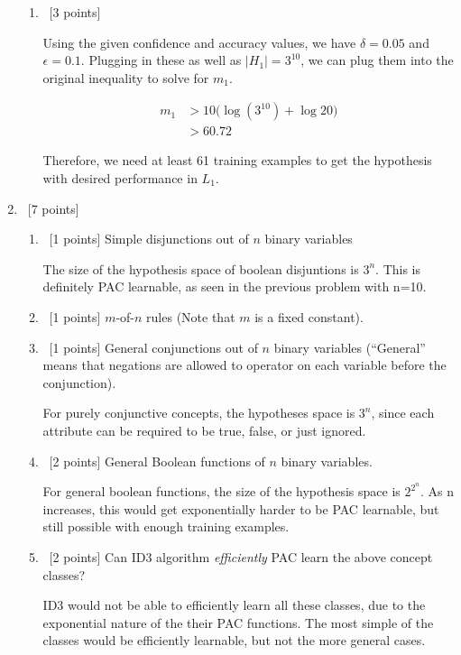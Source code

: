 \documentclass[12pt, fullpage,letterpaper]{article}
\begin{document}
\begin{enumerate}
\begin{enumerate}
	
	
	\item~[3 points] 
	
	Using the given confidence and accuracy values, we have $\delta=0.05$ and $\epsilon=0.1$. Plugging in these as well as $|H_1|=3^{10}$, we can plug them into the original inequality to solve for $m_1$.
	
	\[
		\begin{split}
			m_1 &> 10\big(\log(3^{10}) + \log20\big)
			\\
			&> 60.72
		\end{split}	
	\]
	
	Therefore, we need at least 61 training examples to get the hypothesis with desired performance in $L_1$.
\end{enumerate}

\item~[7 points] 
\begin{enumerate}
	\item~[1 points] Simple disjunctions out of $n$ binary variables
	
		The size of the hypothesis space of boolean disjuntions is $3^n$. This is definitely PAC learnable, as seen in the previous problem with n=10.
	
	\item~[1 points] $m$-of-$n$ rules (Note that $m$ is a fixed constant).  
	
	
	\item~[1 points] General conjunctions out of $n$ binary variables (``General'' means that negations are allowed to operator on each variable before the conjunction).
	
	For purely conjunctive concepts, the hypotheses space is $3^n$, since each attribute can be required to be true, false, or just ignored. 
	
	
	\item~[2 points] General Boolean functions of $n$ binary variables. 
	
	For general boolean functions, the size of the hypothesis space is $2^{2^n}$. As n increases, this would get exponentially harder to be PAC learnable, but still possible with enough training examples. 
	
	
	\item~[2 points] Can ID3 algorithm \textit{efficiently} PAC learn the above concept classes? 
	
	ID3 would not be able to efficiently learn all these classes, due to the exponential nature of the their PAC functions. The most simple of the classes would be efficiently learnable, but not the more general cases. 
	

\end{enumerate}
\end{enumerate}
\end{document}
